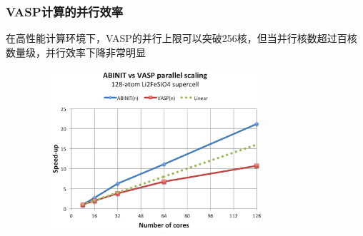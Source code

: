 \frame
{
	\frametitle{\textrm{VASP}计算的并行效率}
	在高性能计算环境下，\textrm{VASP}的并行上限可以突破\textrm{256}核，但当并行核数超过百核数量级，并行效率下降非常明显
\begin{figure}[h!]
	\vspace{-0.10in}
\centering
\includegraphics[height=2.35in,width=3.55in,viewport=0 0 240 180,clip]{Figures/VASP-abinit_Li128-1.png}
\label{ABINIT_vs_VASP-2}
\end{figure} 
}

